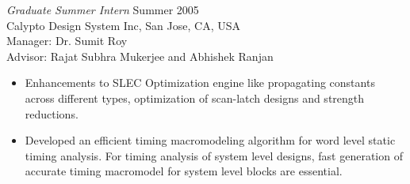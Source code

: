 \documentclass[margin]{res}
\begin{document}
\begin{resume}
{\sl Graduate Summer Intern} \hfill Summer 2005\\
Calypto Design System Inc, San Jose, CA, USA\\
Manager: Dr. Sumit Roy\\
Advisor: Rajat Subhra Mukerjee and Abhishek Ranjan
\begin{itemize} \itemsep -2pt
\item Enhancements to SLEC Optimization engine like propagating constants across different types, 
  optimization of scan-latch designs and strength reductions.
\item Developed an efficient timing macromodeling algorithm for word level static timing analysis.
  For timing analysis of system level designs, fast generation of accurate timing macromodel 
  for system level blocks are essential. 
\end{itemize}


\end{resume}
\end{document}

